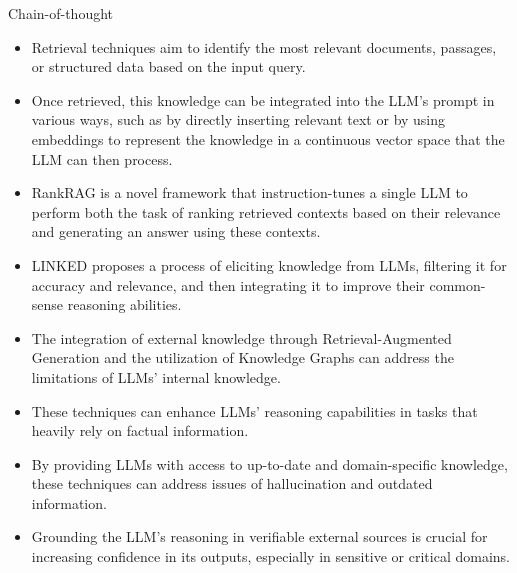 \begin{frame}[allowframebreaks]{Chain-of-thought}
\begin{itemize}
	\item Retrieval techniques aim to identify the most relevant documents, passages, or structured data based on the input query.
	\item Once retrieved, this knowledge can be integrated into the LLM’s prompt in various ways, such as by directly inserting relevant text or by using embeddings to represent the knowledge in a continuous vector space that the LLM can then process.
	\item RankRAG is a novel framework that instruction-tunes a single LLM to perform both the task of ranking retrieved contexts based on their relevance and generating an answer using these contexts.
	\item LINKED proposes a process of eliciting knowledge from LLMs, filtering it for accuracy and relevance, and then integrating it to improve their common-sense reasoning abilities.
	\item The integration of external knowledge through Retrieval-Augmented Generation and the utilization of Knowledge Graphs can address the limitations of LLMs’ internal knowledge.
	\item These techniques can enhance LLMs’ reasoning capabilities in tasks that heavily rely on factual information.
	\item By providing LLMs with access to up-to-date and domain-specific knowledge, these techniques can address issues of hallucination and outdated information.
	\item Grounding the LLM’s reasoning in verifiable external sources is crucial for increasing confidence in its outputs, especially in sensitive or critical domains.
\end{itemize}
\end{frame}